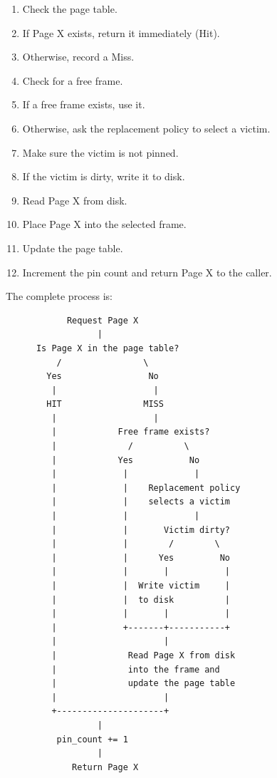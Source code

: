\documentclass[12pt,a4paper]{article}
\begin{document}
\begin{enumerate}
    \item Check the page table.
    \item If Page X exists, return it immediately (Hit).
    \item Otherwise, record a Miss.
    \item Check for a free frame.
    \item If a free frame exists, use it.
    \item Otherwise, ask the replacement policy to select a victim.
    \item Make sure the victim is not pinned.
    \item If the victim is dirty, write it to disk.
    \item Read Page X from disk.
    \item Place Page X into the selected frame.
    \item Update the page table.
    \item Increment the pin count and return Page X to the caller.
\end{enumerate}

The complete process is:

\begin{verbatim}
            Request Page X
                  |
      Is Page X in the page table?
          /                \
        Yes                 No
         |                   |
        HIT                MISS
         |                   |
         |            Free frame exists?
         |              /          \
         |            Yes           No
         |             |             |
         |             |    Replacement policy
         |             |    selects a victim
         |             |             |
         |             |       Victim dirty?
         |             |        /        \
         |             |      Yes         No
         |             |       |           |
         |             |  Write victim     |
         |             |  to disk          |
         |             |       |           |
         |             +-------+-----------+
         |                     |
         |              Read Page X from disk
         |              into the frame and
         |              update the page table
         |                     |
         +---------------------+
                  |
          pin_count += 1
                  |
             Return Page X
\end{verbatim}
\end{document}
